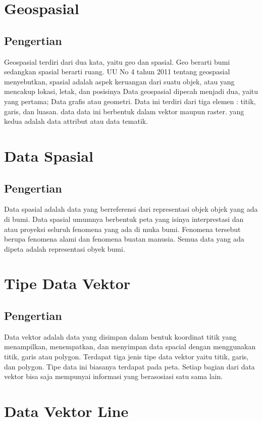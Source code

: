 \section{Geospasial}
\subsection{Pengertian}
Geospasial terdiri dari dua kata, yaitu geo dan spasial. Geo berarti bumi sedangkan spasial berarti 
ruang. UU No 4 tahun 2011 tentang geospasial menyebutkan, spasial adalah aspek keruangan dari suatu objek, 
atau yang mencakup lokasi, letak, dan posisinya
Data geospasial dipecah menjadi dua, yaitu yang pertama; Data grafis atau geometri. Data ini terdiri dari
tiga elemen : titik, garis, dan luasan. data data ini berbentuk dalam vektor maupun raster. yang kedua
adalah data attribut atau data tematik.

\section{Data Spasial}
\subsection{Pengertian}
Data spasial adalah data yang berreferensi dari representasi objek objek yang ada di bumi.
Data spasial umumnya berbentuk peta yang isinya interprestasi dan atau proyeksi seluruh 
fenomena yang ada di muka bumi. Fenomena tersebut berupa fenomena alami dan fenomena 
buatan manusia. Semua data yang ada dipeta adalah representasi obyek bumi.

\section{Tipe Data Vektor}
\subsection{Pengertian}
Data vektor adalah data yang disimpan dalam bentuk koordinat titik yang menampilkan, 
menempatkan, dan menyimpan data spacial dengan menggunakan titik, garis atau polygon.
Terdapat tiga jenis tipe data vektor yaitu titik, garis, dan polygon. Tipe data ini 
biasanya terdapat pada peta. Setiap bagian dari data vektor bisa saja mempunyai 
informasi yang berasosiasi satu sama lain.

\section{Data Vektor Line}
